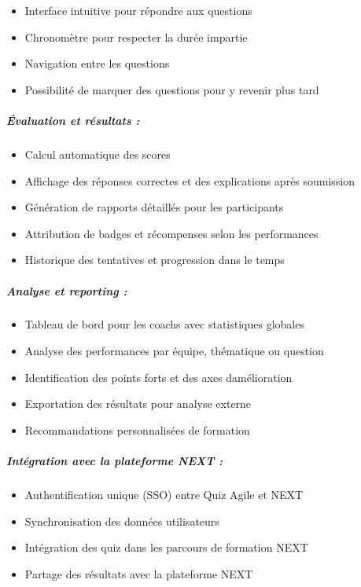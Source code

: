 \documentclass[12pt,a4paper,twoside]{report}
\begin{document}
\begin{itemize}
\item
  Interface intuitive pour répondre aux questions
\item
  Chronomètre pour respecter la durée impartie
\item
  Navigation entre les questions
\item
  Possibilité de marquer des questions pour y revenir plus tard
\end{itemize}

\hypertarget{uxe9valuation-et-ruxe9sultats}{%
\subparagraph{Évaluation et résultats
:}\label{uxe9valuation-et-ruxe9sultats}}

\begin{itemize}
\item
  Calcul automatique des scores
\item
  Affichage des réponses correctes et des explications après soumission
\item
  Génération de rapports détaillés pour les participants
\item
  Attribution de badges et récompenses selon les performances
\item
  Historique des tentatives et progression dans le temps
\end{itemize}

\hypertarget{analyse-et-reporting}{%
\subparagraph{Analyse et reporting :}\label{analyse-et-reporting}}

\begin{itemize}
\item
  Tableau de bord pour les coachs avec statistiques globales
\item
  Analyse des performances par équipe, thématique ou question
\item
  Identification des points forts et des axes
  d\textquotesingle amélioration
\item
  Exportation des résultats pour analyse externe
\item
  Recommandations personnalisées de formation
\end{itemize}

\hypertarget{intuxe9gration-avec-la-plateforme-next}{%
\subparagraph{Intégration avec la plateforme NEXT
:}\label{intuxe9gration-avec-la-plateforme-next}}

\begin{itemize}
\item
  Authentification unique (SSO) entre Quiz Agile et NEXT
\item
  Synchronisation des données utilisateurs
\item
  Intégration des quiz dans les parcours de formation NEXT
\item
  Partage des résultats avec la plateforme NEXT
\end{itemize}
\end{document}
